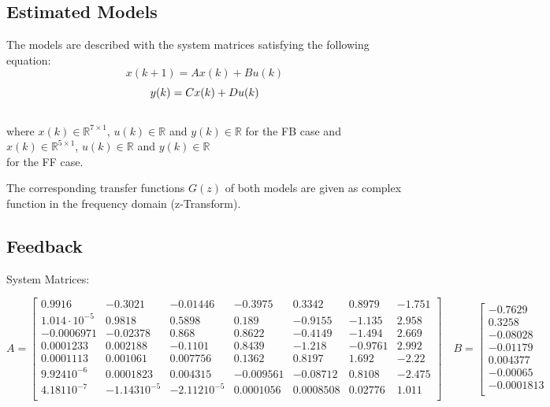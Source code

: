 \begin{landscape}
\chapter{Estimated Models}\label{sec:models}

The models are described with the system matrices satisfying the following equation:
\[x(k + 1) = Ax(k) + Bu(k)\]
\[y(k) = Cx(k) + Du(k)\\\]
\\
where $x(k) \in \mathbb{R}^{7\times1}$, $u(k) \in \mathbb{R}$ and $y(k) \in \mathbb{R}$ for the FB case and $x(k) \in \mathbb{R}^{5\times1}$, $u(k) \in \mathbb{R}$ and $y(k) \in \mathbb{R}$\\ for the FF case.

The corresponding transfer functions $G(z) $ of both models are given as complex function in the frequency domain (z-Transform).

\section{Feedback}

System Matrices:
 
\[A = \left[ \begin{array}{ccccccc}

        0.9916  &   -0.3021  &  -0.01446  &   -0.3975  &    0.3342  &    0.8979   &   -1.751\\
    1.014\cdot10^{-5} &     0.9818   &   0.5898   &    0.189  &   -0.9155   &   -1.135   &    2.958\\
    -0.0006971 &   -0.02378  &     0.868   &   0.8622  &   -0.4149  &    -1.494   &    2.669\\
    0.0001233  &  0.002188   &  -0.1101  &    0.8439  &    -1.218  &   -0.9761    &   2.992\\
      0.0001113 &   0.001061 &   0.007756   &   0.1362  &    0.8197   &    1.692    &   -2.22\\
      9.92410^{-6} &  0.0001823 &   0.004315  &  -0.009561 &   -0.08712  &    0.8108   &   -2.475\\
     4.18110^{-7} & -1.14310^{-5} & -2.11210^{-5}  &  0.0001056 &  0.0008508  &   0.02776  &     1.011\\

\end{array} \right] \quad B = \left[ \begin{array}{c}

       -0.7629\\
      0.3258\\
       -0.08028\\
       -0.01179\\
      0.004377\\
      -0.00065\\
     -0.0001813\\


\end{array}\]
\end{landscape}
